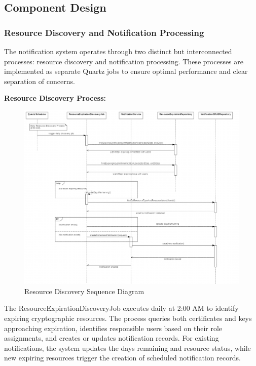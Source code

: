 \subsection{Component Design}

\subsubsection{Resource Discovery and Notification Processing}

The notification system operates through two distinct but interconnected processes: resource discovery and notification processing. These processes are implemented as separate Quartz jobs to ensure optimal performance and clear separation of concerns.

\newpage
\noindent
\textbf{Resource Discovery Process:}

\begin{figure}[H]
    \centering
    \includegraphics[width=1\textwidth]{images/resource_discovery_sequence.png}
    \caption{Resource Discovery Sequence Diagram}
    \label{fig:resource_discovery_sequence}
\end{figure}

\noindent
The ResourceExpirationDiscoveryJob executes daily at 2:00 AM to identify expiring cryptographic resources. The process queries both certificates and keys approaching expiration, identifies responsible users based on their role assignments, and creates or updates notification records. For existing notifications, the system updates the days remaining and resource status, while new expiring resources trigger the creation of scheduled notification records.

